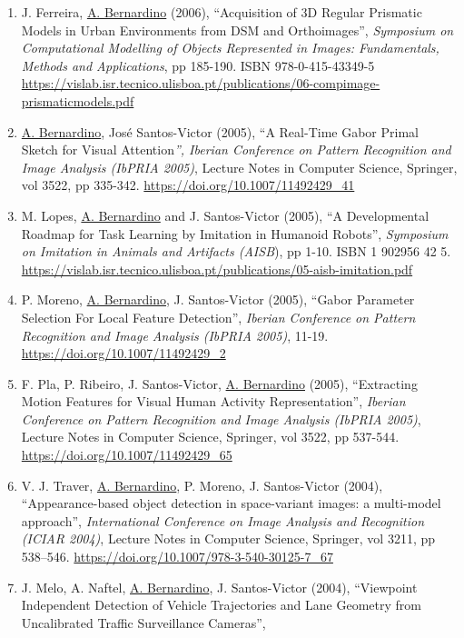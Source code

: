 \begin{enumerate}
  Head'', \emph{IEEE International Conference on Robotics and Automation
  (ICRA)}, pp 94-100. \url{https://doi.org/10.1109/ROBOT.2006.1641167}~
\item
  J. Ferreira, \ul{A. Bernardino} (2006), ``Acquisition of 3D Regular
  Prismatic Models in Urban Environments from DSM and Orthoimages'',
  \emph{Symposium on Computational Modelling of Objects Represented in
  Images: Fundamentals, Methods and Applications}, pp 185-190. ISBN
  978-0-415-43349-5
  \url{https://vislab.isr.tecnico.ulisboa.pt/publications/06-compimage-prismaticmodels.pdf}
\item
  \ul{A. Bernardino}, José Santos-Victor (2005), ``A Real-Time Gabor
  Primal Sketch for Visual Attention\emph{'', Iberian Conference on
  Pattern Recognition and Image Analysis (IbPRIA 2005)}, Lecture Notes
  in Computer Science, Springer, vol 3522, pp 335-342.
  \url{https://doi.org/10.1007/11492429_41}~
\item
  M. Lopes, \ul{A. Bernardino} and J. Santos-Victor (2005), ``A
  Developmental Roadmap for Task Learning by Imitation in Humanoid
  Robots'', \emph{Symposium on Imitation in Animals and Artifacts
  (AISB}), pp 1-10. ISBN 1 902956 42 5.
  \url{https://vislab.isr.tecnico.ulisboa.pt/publications/05-aisb-imitation.pdf}~
\item
  P. Moreno, \ul{A. Bernardino}, J. Santos-Victor (2005), ``Gabor
  Parameter Selection For Local Feature Detection'', \emph{Iberian
  Conference on Pattern Recognition and Image Analysis (IbPRIA 2005)},
  11-19. \url{https://doi.org/10.1007/11492429_2}~
\item
  F. Pla, P. Ribeiro, J. Santos-Victor, \ul{A. Bernardino} (2005),
  ``Extracting Motion Features for Visual Human Activity
  Representation'', \emph{Iberian Conference on Pattern Recognition and
  Image Analysis (IbPRIA 2005)}, Lecture Notes in Computer Science,
  Springer, vol 3522, pp 537-544.
  \url{https://doi.org/10.1007/11492429_65}~
\item
  V. J. Traver, \ul{A. Bernardino}, P. Moreno, J. Santos-Victor (2004),
  ``Appearance-based object detection in space-variant images: a
  multi-model approach'', \emph{International Conference on Image
  Analysis and Recognition (ICIAR 2004)}, Lecture Notes in Computer
  Science, Springer, vol 3211, pp 538--546.
  \url{https://doi.org/10.1007/978-3-540-30125-7_67}~
\item
  J. Melo, A. Naftel, \ul{A. Bernardino}, J. Santos-Victor (2004),
  ``Viewpoint Independent Detection of Vehicle Trajectories and Lane
  Geometry from Uncalibrated Traffic Surveillance Cameras'',

\end{enumerate}
